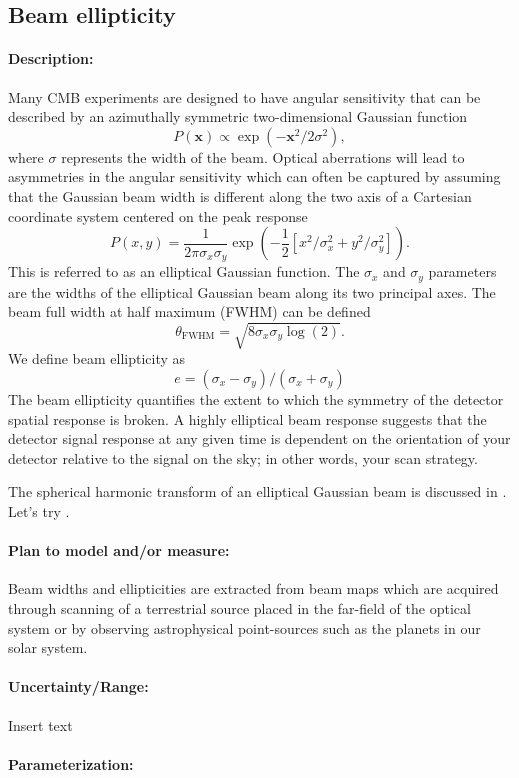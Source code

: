 \subsection{Beam ellipticity}

\paragraph{Description:}
Many CMB experiments are designed to have angular sensitivity that can be described by an azimuthally symmetric two-dimensional Gaussian function
\begin{equation} 
P (\mathbf{x}) \propto \exp (-\mathbf{x} ^2/2\sigma ^2),
\end{equation}
where $\sigma$ represents the width of the beam. Optical aberrations will lead to asymmetries in the angular sensitivity which can often be captured by assuming that the Gaussian beam width is different along the two axis of a Cartesian coordinate system centered on the peak response
\begin{equation}
P (x,y) = \frac{1}{2\pi \sigma_x \sigma_y} \exp (-\frac{1}{2}[x^2/\sigma ^2_x + y^2/\sigma ^2_y]).
\end{equation}
This is referred to as an elliptical Gaussian function. The $\sigma_x$ and $\sigma_y$ parameters are the widths of the elliptical Gaussian beam along its two principal axes. The beam full width at half maximum (FWHM) can be defined 
\begin{equation}
\theta _\mathrm{FWHM} = \sqrt{8\sigma_x \sigma_y\log{(2)}}. 
\end{equation}
We define beam ellipticity as 
\begin{equation}
e = (\sigma_x-\sigma_y)/(\sigma_x+\sigma_y)
\end{equation}
The beam ellipticity quantifies the extent to which the symmetry of the detector spatial response is broken. A highly elliptical beam response suggests that the detector signal response at any given time is dependent on the orientation of your detector relative to the signal on the sky; in other words, your scan strategy.

The spherical harmonic transform of an elliptical Gaussian beam is discussed in \cite{Souradeep2001}. Let's try \cite{Takahashi2010}.

\paragraph{Plan to model and/or measure:}
Beam widths and ellipticities are extracted from beam maps which are acquired through scanning of a terrestrial source placed in the far-field of the optical system or by observing astrophysical point-sources such as the planets in our solar system.

\paragraph{Uncertainty/Range:}
Insert text

\paragraph{Parameterization:}
